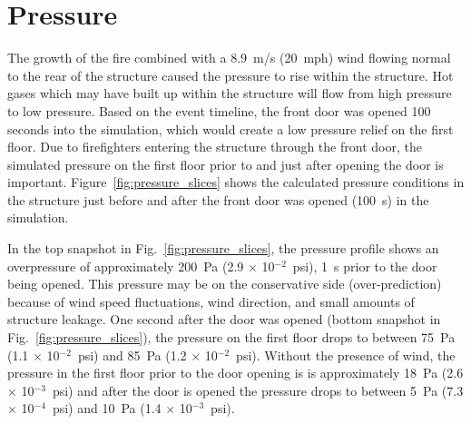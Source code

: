 \documentclass[12pt,oneside]{book}
\begin{document}
\clearpage

\section{Pressure}
\label{pressure}

The growth of the fire combined with a 8.9~m/s (20~mph) wind flowing normal to the rear of the structure caused the pressure to rise within the structure. Hot gases which may have built up within the structure will flow from high pressure to low pressure. Based on the event timeline, the front door was opened 100 seconds into the simulation, which would create a low pressure relief on the first floor. Due to firefighters entering the structure through the front door, the simulated pressure on the first floor prior to and just after opening the door is important. Figure~\ref{fig:pressure_slices} shows the calculated pressure conditions in the structure just before and after the front door was opened (100~s) in the simulation.

In the top snapshot in Fig.~\ref{fig:pressure_slices}, the pressure profile shows an overpressure of approximately 200~Pa (2.9 $\times$ 10$^{-2}$~psi), 1~s prior to the door being opened. This pressure may be on the conservative side (over-prediction) because of wind speed fluctuations, wind direction, and small amounts of structure leakage. One second after the door was opened (bottom snapshot in Fig.~\ref{fig:pressure_slices}), the pressure on the first floor drops to between 75~Pa (1.1 $\times$ 10$^{-2}$~psi) and 85~Pa (1.2 $\times$ 10$^{-2}$~psi). Without the presence of wind, the pressure in the first floor prior to the door opening is is approximately 18~Pa (2.6 $\times$ 10$^{-3}$~psi) and after the door is opened the pressure drops to between 5~Pa (7.3 $\times$ 10$^{-4}$~psi) and 10~Pa (1.4 $\times$ 10$^{-3}$~psi).

\clearpage
\end{document}
